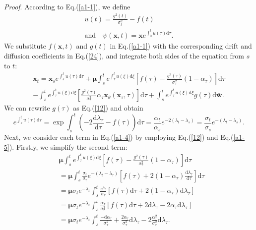\textit{Proof}. According to Eq.(\ref{a1-1}), we define
\begin{align*}
u(t)=\frac{g^2(t)}{\sigma_t^2}-f(t)\\
\text{and}\quad\psi(\boldsymbol{x},t)=\boldsymbol{x}e^{\int_0^tu(\tau)\mathrm{d}\tau}.
\end{align*}
We substitute $f(\boldsymbol{x},t)$ and $g(t)$ in Eq.(\ref{a1-1}) with the corresponding drift and diffusion coefficients in Eq.(\ref{24}), and integrate both sides of the equation from $s$ to $t$:
\begin{equation}
\begin{aligned}
\boldsymbol{x}_t=\boldsymbol{x}_se^{\int_s^tu(\tau)\mathrm{d}\tau}
+\boldsymbol\mu\int_s^te^{\int_\tau^tu(\xi)\mathrm{d}\xi}\left[f(\tau)-\frac{g^2(\tau)}{\sigma^2_\tau}(1-\alpha_\tau)\right]\mathrm{d}\tau\\
-\int_s^te^{\int_\tau^tu(\xi)\mathrm{d}\xi}\left[\frac{g^2(\tau)}{\sigma^2_\tau}\alpha_\tau\boldsymbol{x}_\theta(\boldsymbol{x}_\tau,\tau)\right]\mathrm{d}\tau
+\int_s^te^{\int_\tau^tu(\xi)\mathrm{d}\xi}g(\tau)\mathrm{d}\bar{\boldsymbol{w}}.
\label{a1-4}
\end{aligned}
\end{equation}
We can rewrite $g(\tau)$ as Eq.(\ref{12}) and obtain
\begin{equation}
e^{\int_s^tu(\tau)\mathrm{d}\tau}=\exp{\int_s^t\left(-2\frac{\mathrm{d}\lambda_\tau}{\mathrm{d}\tau}-f(\tau)\right)\mathrm{d}\tau}
=\frac{\alpha_t}{\alpha_s}e^{-2(\lambda_t-\lambda_s)}
=\frac{\sigma_t}{\sigma_s}e^{-(\lambda_t-\lambda_s)}.
\label{a1-5}
\end{equation}
Next, we consider each term in Eq.(\ref{a1-4}) by employing Eq.(\ref{12}) and Eq.(\ref{a1-5}). Firstly, we simplify the second term:
\begin{align}
&\boldsymbol\mu\int_s^te^{\int_\tau^tu(\xi)\mathrm{d}\xi}\left[f(\tau)-\frac{g^2(\tau)}{\sigma^2_\tau}(1-\alpha_\tau)\right]\mathrm{d}\tau \nonumber\\
&=\boldsymbol\mu\int_s^t\frac{\sigma_t}{\sigma_\tau}e^{-(\lambda_t-\lambda_\tau)}\left[f(\tau)+2(1-\alpha_\tau)\frac{\mathrm{d}\lambda_\tau}{\mathrm{d}\tau}\right]\mathrm{d}\tau \nonumber\\
&=\boldsymbol\mu\sigma_te^{-\lambda_t}\int_s^t\frac{e^{\lambda_\tau}}{\sigma_\tau}\left[f(\tau)\mathrm{d}\tau+2(1-\alpha_\tau)\mathrm{d}\lambda_\tau\right] \nonumber\\
&=\boldsymbol\mu\sigma_te^{-\lambda_t}\int_s^t\frac{\alpha_\tau}{\sigma^2_\tau}\left[f(\tau)\mathrm{d}\tau+2\mathrm{d}\lambda_\tau-2\alpha_\tau\mathrm{d}\lambda_\tau\right] \nonumber\\
&=\boldsymbol\mu\sigma_te^{-\lambda_t}\int_s^t\frac{-\mathrm{d}\alpha_\tau}{\sigma^2_\tau}+\frac{2\alpha_\tau}{\sigma^2_\tau}\mathrm{d}\lambda_\tau-2\frac{\alpha^2_\tau}{\sigma^2_\tau}\mathrm{d}\lambda_\tau.
\label{a1-6}
\end{align}
